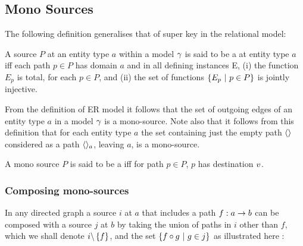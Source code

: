 \subsection{Mono Sources}

The following definition generalises that of super key in the relational model:
\begin{definition}
A source $P$  at an entity type $a$ within a model $\gamma$ is said to be a  at entity type $a$ iff each path $p \in P$ has domain $a$ and  in all defining instances E, 
(i) the function $E_p$ is total, for each $p \in P$, and (ii) the set of functions
$\left\{E_p \ \middle|\ p\in P\right\}$ is jointly injective.
\end{definition}


From the definition of ER model it follows that the set of outgoing edges of an entity type 
$a$ in a model $\gamma$ is a mono-source. Note also that it follows from this definition that for each entity type $a$ the set containing just
the empty path $\langle\rangle$ considered as a path $\langle\rangle_a$, leaving $a$, is a mono-source.  
\begin{definition}
A mono source $P$ is said to be a  iff for path $p \in P$, $p$ has destination $v$.
\end{definition}


\subsubsection{Composing mono-sources}

In any directed graph a source $i$ at $a$ that includes a path $f:a \rightarrow b$ can be composed with a source $j$ at $b$ by taking the union of paths in $i$ other than $f$, which we shall denote $i\backslash \left\{f\right\}$, and the set $\left\{f \circ g \ \middle|\ g \in j\right\}$ as illustrated here :

